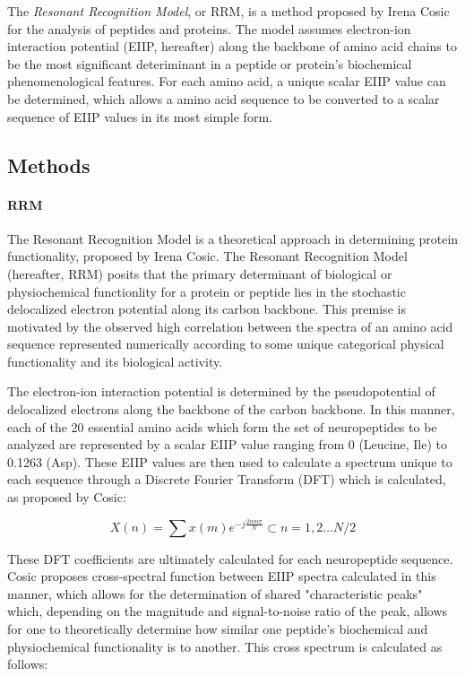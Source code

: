 \documentclass[]{article}
\let\oldparagraph\paragraph
\renewcommand{\paragraph}[1]{\oldparagraph{#1}\mbox{}}
\begin{document}
The \emph{Resonant Recognition Model}, or RRM, is a method proposed by Irena Cosic for the analysis of peptides and proteins. The model assumes electron-ion interaction potential (EIIP, hereafter) along the backbone of amino acid chains to be the most significant deteriminant in a peptide or protein's biochemical phenomenological features. For each amino acid, a unique scalar EIIP value can be determined, which allows a amino acid sequence to be converted to a scalar sequence of EIIP values in its most simple form.

\hypertarget{methods}{%
\subsection{Methods}\label{methods}}

\hypertarget{rrm}{%
\paragraph{RRM}\label{rrm}}

The Resonant Recognition Model is a theoretical approach in determining protein functionality, proposed by Irena Cosic. The Resonant Recognition Model (hereafter, RRM) posits that the primary determinant of biological or physiochemical functionlity for a protein or peptide lies in the stochastic delocalized electron potential along its carbon backbone. This premise is motivated by the observed high correlation between the spectra of an amino acid sequence represented numerically according to some unique categorical physical functionality and its biological activity. 

The electron-ion interaction potential is determined by the pseudopotential of delocalized electrons along the backbone of the carbon backbone. In this manner, each of the 20 essential amino acids which form the set of neuropeptides to be analyzed are represented by a scalar EIIP value ranging from 0 (Leucine, Ile) to 0.1263 (Asp). These EIIP values are then used to calculate a spectrum unique to each sequence through a Discrete Fourier Transform (DFT) which is calculated, as proposed by Cosic:

\begin{equation}
    X(n) = \sum x(m) e^{-j\frac{2nm\pi}{N}} \subset n = 1,2 \dots N/2
\end{equation}

These DFT coefficients are ultimately calculated for each neuropeptide sequence. Cosic proposes cross-spectral function between EIIP spectra calculated in this manner, which allows for the determination of shared "characteristic peaks" which, depending on the magnitude and signal-to-noise ratio of the peak, allows for one to theoretically determine how similar one peptide's biochemical and physiochemical functionality is to another. This cross spectrum is calculated as follows:
\end{document}
